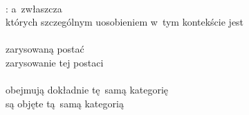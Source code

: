 \documentclass[a4paper,11pt]{article}
\begin{document}
\noi
{} \\
\Jest: a~zwłaszcza \\
\Pow których szczególnym uosobieniem w~tym kontekście jest \\
 \\
\Jest zarysowaną postać \\
\Pow zarysowanie tej postaci \\
 \\
\Jest obejmują dokładnie tę~samą kategorię \\
\Pow są objęte tą~samą kategorią \\

\vspace{\spaceTwo}













\end{document}
